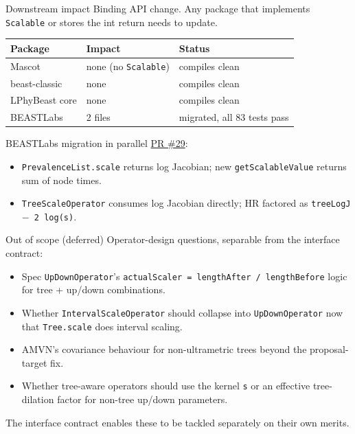 \documentclass[aspectratio=169,11pt]{beamer}
\newcommand{\code}[1]{\texttt{#1}}
\begin{document}
\begin{frame}{Downstream impact}
Binding API change.
Any package that implements \code{Scalable} or stores the int return needs to update.

\vspace{1em}

\begin{tabular}{lll}
\toprule
\textbf{Package} & \textbf{Impact} & \textbf{Status} \\
\midrule
Mascot          & none (no \code{Scalable}) & compiles clean \\
beast-classic   & none                       & compiles clean \\
LPhyBeast core  & none                       & compiles clean \\
BEASTLabs       & 2 files                    & migrated, all 83 tests pass \\
\bottomrule
\end{tabular}

\vspace{1em}

BEASTLabs migration in parallel \href{https://github.com/BEAST2-Dev/BEASTLabs/pull/29}{PR \#29}:

\begin{itemize}
\item \code{PrevalenceList.scale} returns log Jacobian; new \code{getScalableValue} returns sum of node times.
\item \code{TreeScaleOperator} consumes log Jacobian directly; HR factored as \code{treeLogJ $-$ 2 log(s)}.
\end{itemize}
\end{frame}

\begin{frame}{Out of scope (deferred)}
Operator-design questions, separable from the interface contract:

\begin{itemize}
\item Spec \code{UpDownOperator}'s \code{actualScaler = lengthAfter / lengthBefore} logic for tree + up/down combinations.
\item Whether \code{IntervalScaleOperator} should collapse into \code{UpDownOperator} now that \code{Tree.scale} does interval scaling.
\item AMVN's covariance behaviour for non-ultrametric trees beyond the proposal-target fix.
\item Whether tree-aware operators should use the kernel \code{s} or an effective tree-dilation factor for non-tree up/down parameters.
\end{itemize}

\vspace{1em}

The interface contract enables these to be tackled separately on their own merits.
\end{frame}
\end{document}
